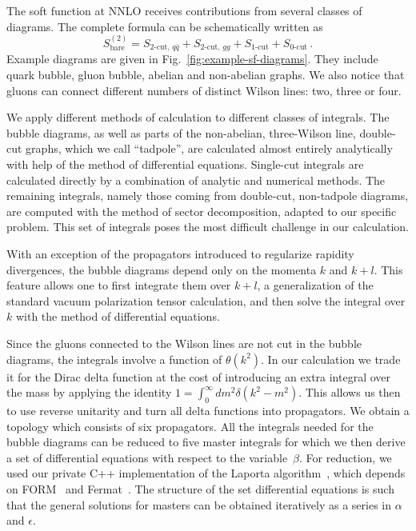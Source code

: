 \documentclass{PoS}
\begin{document}
The soft function at NNLO receives contributions from several classes of
diagrams. The complete formula can be schematically written as
%
\begin{equation}
  S^{(2)}_\text{bare} = 
  S_\text{2-cut, $q\bar q$} + 
  S_\text{2-cut, $gg$} + 
  S_\text{1-cut} + 
  S_\text{0-cut}\,.
  \label{eq:SFbare-contr}
\end{equation}
%
Example diagrams are given in Fig.~\ref{fig:example-sf-diagrams}. They include
quark bubble, gluon bubble, abelian and non-abelian graphs. We also notice
that gluons can connect different numbers of  distinct Wilson lines: two, three
or four.

We apply different methods of calculation to different classes of integrals. The
bubble diagrams, as well as parts of the non-abelian, three-Wilson line,
double-cut graphs, which we call ``tadpole'', are calculated almost entirely
analytically with help of the method of differential equations. Single-cut
integrals are calculated directly by a combination of analytic and numerical
methods. The remaining integrals, namely those coming from double-cut,
non-tadpole diagrams, are computed with the method of sector decomposition,
adapted to our specific problem. This set of integrals poses the most difficult
challenge in our calculation.  

With an exception of the propagators introduced to regularize rapidity
divergences, the bubble diagrams depend only on the momenta $k$ and $k+l$. This
feature allows one to first integrate them over $k+l$, a generalization of
the standard vacuum polarization tensor calculation, and then solve the integral
over $k$ with the method of differential equations.

Since the gluons connected to the Wilson lines are not cut in the bubble
diagrams,  the integrals involve a function of $\theta(k^2)$. In our calculation
we trade it for the Dirac delta function at the cost of introducing an extra
integral over the mass by applying the identity $1 = \int_0^\infty dm^2
\delta(k^2-m^2)$. This allows us then to use reverse unitarity and turn all
delta functions into propagators. We obtain a topology which consists of
six propagators. 
%
All the integrals needed for the bubble diagrams can be reduced to five master
integrals for which we then derive a set of differential equations with respect
to the variable~$\beta$. For reduction, we used our private C++ implementation of
the Laporta algorithm~\cite{Laporta:2001dd}, which depends on {
FORM}~\cite{Ruijl:2017dtg} and {Fermat}~\cite{fermat}. 
%
The structure of the set differential equations is such that the general
solutions for masters can be obtained iteratively as a series in $\alpha$ and
$\epsilon$. 
\end{document}
